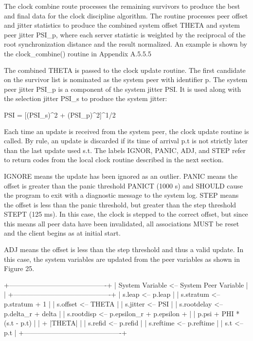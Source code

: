 The clock combine route processes the remaining survivors to produce
the best and final data for the clock discipline algorithm.  The
routine processes peer offset and jitter statistics to produce the
combined system offset THETA and system peer jitter PSI_p, where each
server statistic is weighted by the reciprocal of the root
synchronization distance and the result normalized.  An example is
shown by the clock_combine() routine in Appendix A.5.5.5

The combined THETA is passed to the clock update routine.  The first
candidate on the survivor list is nominated as the system peer with
identifier p.  The system peer jitter PSI_p is a component of the
system jitter PSI.  It is used along with the selection jitter PSI_s
to produce the system jitter:

PSI = [(PSI_s)^2 + (PSI_p)^2]^1/2

Each time an update is received from the system peer, the clock
update routine is called.  By rule, an update is discarded if its
time of arrival p.t is not strictly later than the last update used
s.t.  The labels IGNOR, PANIC, ADJ, and STEP refer to return codes
from the local clock routine described in the next section.

IGNORE means the update has been ignored as an outlier.  PANIC means
the offset is greater than the panic threshold PANICT (1000 s) and
SHOULD cause the program to exit with a diagnostic message to the
system log.  STEP means the offset is less than the panic threshold,
but greater than the step threshold STEPT (125 ms).  In this case,
the clock is stepped to the correct offset, but since this means all
peer data have been invalidated, all associations MUST be reset and
the client begins as at initial start.

ADJ means the offset is less than the step threshold and thus a valid
update.  In this case, the system variables are updated from the peer
variables as shown in Figure 25.

              +-------------------------------------------+
              | System Variable <-- System Peer Variable  |        |
              +-------------------------------------------+
              | s.leap      <-- p.leap                    |
              | s.stratum   <-- p.stratum + 1             |
              | s.offset    <-- THETA                     |
              | s.jitter    <-- PSI                       |
              | s.rootdelay <-- p.delta_r + delta         |
              | s.rootdisp  <-- p.epsilon_r + p.epsilon + |
              |                 p.psi + PHI * (s.t - p.t) |
              |                 + |THETA|                 |
              | s.refid     <-- p.refid                   |
              | s.reftime   <-- p.reftime                 |
              | s.t         <-- p.t                       |
              +-------------------------------------------+

